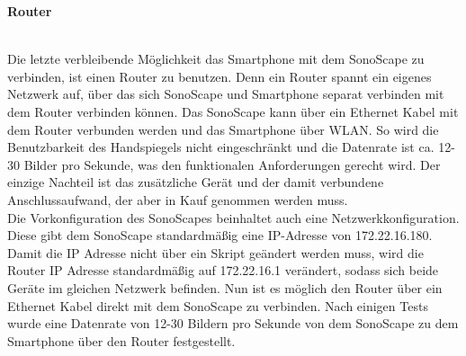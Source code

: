 \begin{large}
\textbf{Router}\\\\
\end{large}
Die letzte verbleibende Möglichkeit das Smartphone mit dem SonoScape zu verbinden, ist einen Router zu benutzen. Denn ein Router spannt ein eigenes Netzwerk auf, über das sich SonoScape und Smartphone separat verbinden mit dem Router verbinden können. Das SonoScape kann über ein Ethernet Kabel mit dem Router verbunden werden und das Smartphone über WLAN. So wird die Benutzbarkeit des Handspiegels nicht eingeschränkt und die Datenrate ist ca. 12-30 Bilder pro Sekunde, was den funktionalen Anforderungen gerecht wird. Der einzige Nachteil ist das zusätzliche Gerät und der damit verbundene Anschlussaufwand, der aber in Kauf genommen werden muss.\\
Die Vorkonfiguration des SonoScapes beinhaltet auch eine Netzwerkkonfiguration. Diese gibt dem SonoScape standardmäßig eine IP-Adresse von 172.22.16.180. Damit die IP Adresse nicht über ein Skript geändert werden muss, wird die Router IP Adresse standardmäßig auf 172.22.16.1 verändert, sodass sich beide Geräte im gleichen Netzwerk befinden. Nun ist es möglich den Router über ein Ethernet Kabel direkt mit dem SonoScape zu verbinden. Nach einigen Tests wurde eine Datenrate von 12-30 Bildern pro Sekunde von dem SonoScape zu dem Smartphone über den Router festgestellt.
 
  




